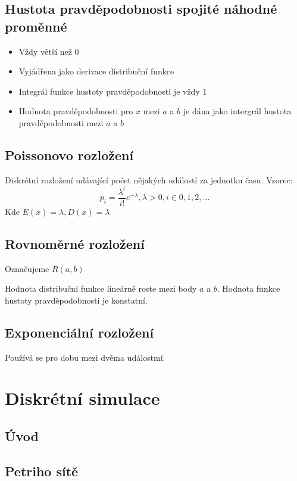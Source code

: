 \documentclass[11pt]{article}
\begin{document}
\subsection{Hustota pravděpodobnosti spojité náhodné proměnné}
\label{sec:org1da2fcd}
\begin{itemize}
\item Vždy větší než 0
\item Vyjádřena jako derivace distribuční funkce
\item Integrál funkce hustoty pravděpodobnosti je vždy 1
\item Hodnota pravděpodobnosti pro \(x\) mezi \(a\) a \(b\) je dána jako intergrál hustota
pravděpodobnosti mezi \(a\) a \(b\)
\end{itemize}

\subsection{Poissonovo rozložení}
\label{sec:orgd954f00}
Diskrétní rozložení udávající počet nějakých událostí za jednotku času. Vzorec:
\begin{equation}
p_i = \frac{\lambda^i}{i!} e^{-\lambda}, \lambda > 0, i \in {0, 1, 2,\dots}
\end{equation}
Kde \(E(x) = \lambda, D(x) = \lambda\)

\subsection{Rovnoměrné rozložení}
\label{sec:orgf57cd50}
Označujeme \(R(a, b)\)

Hodnota distribuční funkce lineárně roste mezi body \(a\) a \(b\). Hodnota funkce
hustoty pravděpodobnosti je konstatní.

\subsection{Exponenciální rozložení}
\label{sec:orga338bfe}
Používá se pro dobu mezi dvěma událostmí.
\section{Diskrétní simulace}
\label{sec:org791c61b}
\subsection{Úvod}
\label{sec:orgf9d3306}
\subsection{Petriho sítě}
\label{sec:org4538d76}
\end{document}

